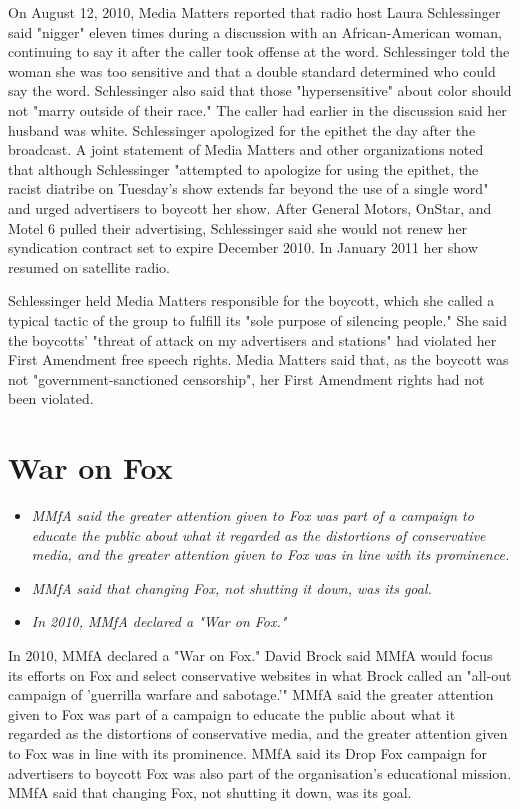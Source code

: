 On August 12, 2010, Media Matters reported that radio host Laura
Schlessinger said "nigger" eleven times during a discussion with an
African-American woman, continuing to say it after the caller took
offense at the word. Schlessinger told the woman she was too sensitive
and that a double standard determined who could say the word.
Schlessinger also said that those "hypersensitive" about color should
not "marry outside of their race." The caller had earlier in the
discussion said her husband was white. Schlessinger apologized for the
epithet the day after the broadcast. A joint statement of Media Matters
and other organizations noted that although Schlessinger "attempted to
apologize for using the epithet, the racist diatribe on Tuesday's show
extends far beyond the use of a single word" and urged advertisers to
boycott her show. After General Motors, OnStar, and Motel 6 pulled their
advertising, Schlessinger said she would not renew her syndication
contract set to expire December 2010. In January 2011 her show resumed
on satellite radio.

Schlessinger held Media Matters responsible for the boycott, which she
called a typical tactic of the group to fulfill its "sole purpose of
silencing people." She said the boycotts' "threat of attack on my
advertisers and stations" had violated her First Amendment free speech
rights. Media Matters said that, as the boycott was not
"government-sanctioned censorship", her First Amendment rights had not
been violated.

\section{War on Fox}\label{war-on-fox}

\begin{itemize}
\item
  \emph{MMfA said the greater attention given to Fox was part of a
  campaign to educate the public about what it regarded as the
  distortions of conservative media, and the greater attention given to
  Fox was in line with its prominence.}
\item
  \emph{MMfA said that changing Fox, not shutting it down, was its
  goal.}
\item
  \emph{In 2010, MMfA declared a "War on Fox."}
\end{itemize}

In 2010, MMfA declared a "War on Fox." David Brock said MMfA would focus
its efforts on Fox and select conservative websites in what Brock called
an "all-out campaign of 'guerrilla warfare and sabotage.'" MMfA said the
greater attention given to Fox was part of a campaign to educate the
public about what it regarded as the distortions of conservative media,
and the greater attention given to Fox was in line with its prominence.
MMfA said its Drop Fox campaign for advertisers to boycott Fox was also
part of the organisation's educational mission. MMfA said that changing
Fox, not shutting it down, was its goal.

